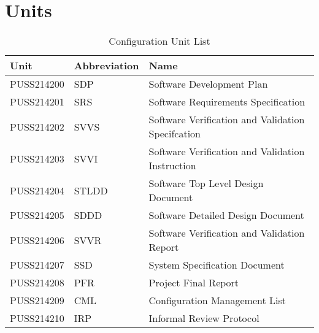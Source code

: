 \documentclass{article}
\date {#1}
\title {
    \documentNumber {09}    
    
    \documentVersion
    
    \documentTitle {Configuration Unit List}
    \documentGroup {2}
    
    \documentResponsible {Project Management Group}
    \documentAuthors {Project Management group}
    
    \documentDate {2021-01-31}
}
\begin{document}
\maketitle
\thispagestyle{empty}

\newpage

\tableofcontents

\newpage


\section{Units}
    \begin{table}[h] 
        \centering
        \begin{tabular}{|l|l|l|} 
        \hline 
            \textbf{Unit} & \textbf{Abbreviation} & \textbf{Name} \\ 
        \hline
            PUSS214200 & SDP & Software Development Plan \\
        \hline
            PUSS214201 & SRS & Software Requirements Specification \\
        \hline
            PUSS214202 & SVVS & Software Verification and Validation Specifcation \\
        \hline
            PUSS214203 & SVVI & Software Verification and Validation Instruction \\
        \hline
            PUSS214204 & STLDD & Software Top Level Design Document \\
        \hline
            PUSS214205 & SDDD & Software Detailed Design Document \\
        \hline
            PUSS214206 & SVVR & Software Verification and Validation Report \\
        \hline
            PUSS214207 & SSD & System Specification Document \\
        \hline
            PUSS214208 & PFR & Project Final Report \\
        \hline
            PUSS214209 & CML & Configuration Management List \\
        \hline
            PUSS214210 & IRP & Informal Review Protocol \\
        \hline
        \end{tabular} 
        \caption{Configuration Unit List} 
    \end{table}

\end{document}
